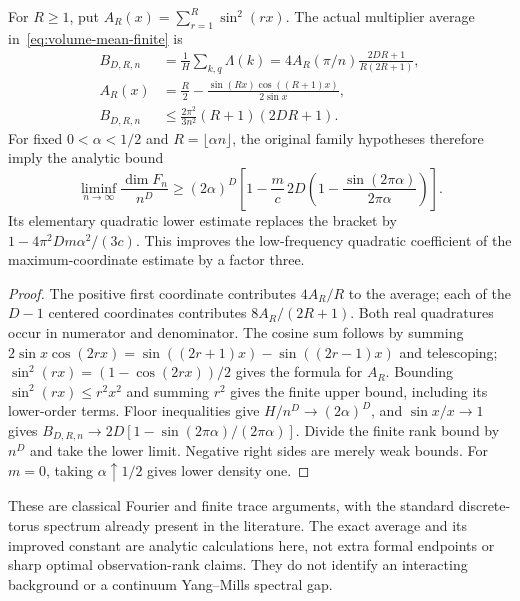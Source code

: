 \begin{proposition}\label{prop:volume-average}
For $R\geq1$, put $A_R(x)=\sum_{r=1}^R\sin^2(rx)$. The actual multiplier
average in~\eqref{eq:volume-mean-finite} is
\begin{align*}
 B_{D,R,n}&=\frac1H\sum_{k,q}\Lambda(k)
   =4A_R(\pi/n)\frac{2DR+1}{R(2R+1)},\\
 A_R(x)&=\frac R2-\frac{\sin(Rx)\cos((R+1)x)}{2\sin x},\\
 B_{D,R,n}&\leq\frac{2\pi^2}{3n^2}(R+1)(2DR+1).
\end{align*}
For fixed $0<\alpha<1/2$ and $R=\lfloor\alpha n\rfloor$, the original
family hypotheses therefore imply the analytic bound
\[
 \liminf_{n\to\infty}\frac{\dim F_n}{n^D}
 \geq(2\alpha)^D\left[1-\frac mc\,2D
       \left(1-\frac{\sin(2\pi\alpha)}{2\pi\alpha}\right)\right].
\]
Its elementary quadratic lower estimate replaces the bracket by
$1-4\pi^2Dm\alpha^2/(3c)$. This improves the low-frequency quadratic
coefficient of the maximum-coordinate estimate by a factor three.
\end{proposition}
\begin{proof}
The positive first coordinate contributes $4A_R/R$ to the average; each
of the $D-1$ centered coordinates contributes $8A_R/(2R+1)$. Both real
quadratures occur in numerator and denominator. The cosine sum follows by
summing $2\sin x\cos(2rx)=\sin((2r+1)x)-\sin((2r-1)x)$ and telescoping;
$\sin^2(rx)=(1-\cos(2rx))/2$ gives the formula for $A_R$.
Bounding $\sin^2(rx)\leq r^2x^2$ and summing $r^2$ gives the finite upper
bound, including its lower-order terms. Floor inequalities give
$H/n^D\to(2\alpha)^D$, and $\sin x/x\to1$ gives
$B_{D,R,n}\to2D[1-\sin(2\pi\alpha)/(2\pi\alpha)]$. Divide the finite
rank bound by $n^D$ and take the lower limit. Negative right sides are merely
weak bounds. For $m=0$, taking $\alpha\uparrow1/2$ gives lower density one.
\end{proof}
These are classical Fourier and finite trace arguments, with the standard
discrete-torus spectrum already present in the literature. The exact average
and its improved constant are analytic calculations here, not extra formal
endpoints or sharp optimal observation-rank claims. They do not identify an
interacting background or a continuum Yang--Mills spectral gap.
